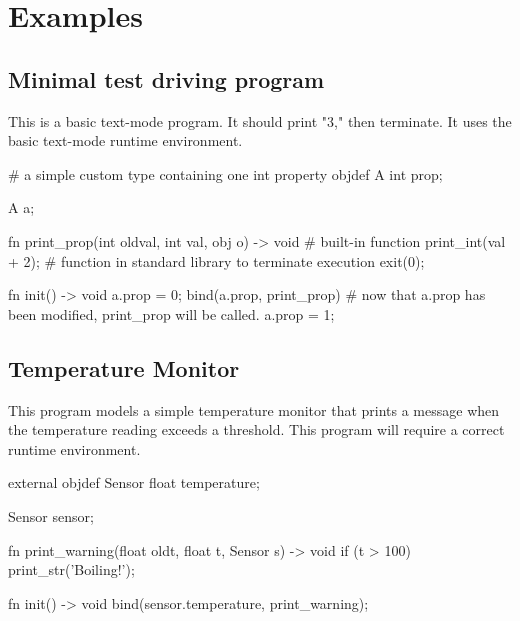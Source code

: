 \section{Examples}
\subsection{Minimal test driving program}
This is a basic text-mode program. It should print "3," then terminate.
It uses the basic text-mode runtime environment.

\vspace{-0.5cm}
\begin{mylisting}
# a simple custom type containing one int property
objdef A
{
  int prop;
}

A a;

fn print_prop(int oldval, int val, obj o) -> void
{
  # built-in function
  print_int(val + 2);
  # function in standard library to terminate execution
  exit(0);
}

fn init() -> void
{
  a.prop = 0;
  bind(a.prop, print_prop)
  # now that a.prop has been modified, print_prop will be called.
  a.prop = 1;
}
\end{mylisting}

\subsection{Temperature Monitor}
This program models a simple temperature monitor that prints a message when the temperature
reading exceeds a threshold. This program will require a correct runtime environment.

\vspace{-0.5cm}
\begin{mylisting}
external objdef Sensor
{
  float temperature;
}

Sensor sensor;

fn print_warning(float oldt, float t, Sensor s) -> void
{
  if (t > 100)
  {
    print_str('Boiling!');
  }
}

fn init() -> void
{
  bind(sensor.temperature, print_warning);
}
\end{mylisting}
